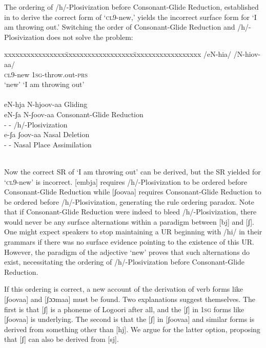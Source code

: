 \documentclass[output=paper]{langsci/langscibook}
\begin{document}
The ordering of /h/-Plosivization before Consonant-Glide Reduction, established in  to derive the correct form of ‘\textsc{cl}9-new,’ yields the incorrect surface form for ‘\textsc{I} am throwing out.’ Switching the order of Consonant-Glide Reduction and /h/-Plosivization does not solve the problem:


\ea\label{ex:glewwe:23}{}
\begin{tabbing}
xxxxxxxxxxxxxxxx\=xxxxxxxxxxxxxxxxxx\=xxxxxxxxxxxxxxxxxx\kill
/eN-hia/   \> /N-hiov-aa/\\
\textsc{cl9}-new  \>  \textsc{1sg}-throw.out-\textsc{prs} \\ 
‘new’ \>  ‘I am throwing out’ \\
  \\
eN-hja  \>    N-hjoov-aa   \>     Gliding\\
eN-ʃa   \>    N-ʃoov-aa    \>    Consonant-Glide Reduction\\
{}-     \>   {}-       \>   /h/-Plosivization\\
e-ʃa    \>   ʃoov-aa   \>    Nasal Deletion{\rmfnm}\\
{}-     \>   {}-      \>    Nasal Place Assimilation\\
\*[eʃa]      \>  [ʃoovaa] \\
\end{tabbing}
\z

Now the correct SR of ‘I am throwing out’ can be derived, but the SR yielded for ‘\textsc{cl}9-new’ is incorrect. [embja] requires /h/-Plosivization to be ordered before Consonant-Glide Reduction while [ʃoovaa] requires Consonant-Glide Reduction to be ordered before /h/-Plosivization, generating the rule ordering paradox. Note that if Consonant-Glide Reduction were indeed to bleed /h/-Plosivization, there would never be any surface alternations within a paradigm between [bj] and [ʃ]. One might expect speakers to stop maintaining a UR beginning with /hi/ in their grammars if there was no surface evidence pointing to the existence of this UR. However, the paradigm of the adjective ‘new’ proves that such alternations do exist, necessitating the ordering of /h/-Plosivization before Consonant-Glide Reduction. 

If this ordering is correct, a new account of the derivation of verb forms like [ʃoovaa] and [ʃɔɔmaa] must be found. Two explanations suggest themselves. The first is that [ʃ] is a phoneme of Logoori after all, and the [ʃ] in 1\textsc{sg} forms like [ʃoovaa] is underlying. The second is that the [ʃ] in [ʃoovaa] and similar forms is derived from something other than [hj]. We argue for the latter option, proposing that [ʃ] can also be derived from [sj].
\end{document}
